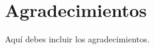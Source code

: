 \chapter{Agradecimientos}
Aquí debes incluir los agradecimientos.

\newpage
\thispagestyle{empty}
\hspace*{0.5cm}
\newpage

